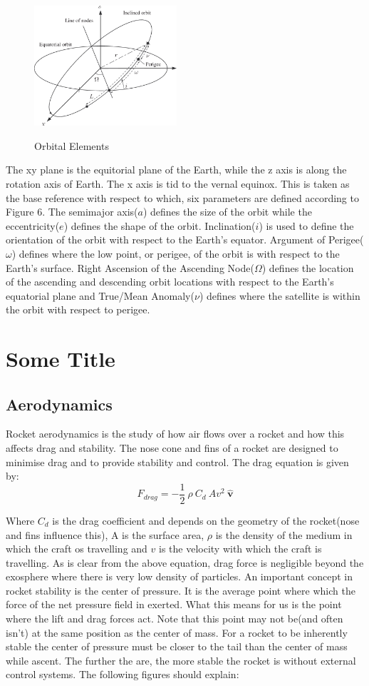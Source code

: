 \documentclass[12pt, letterpaper]{article}
\begin{document}
\begin{figure}[ht]
	\centering
    \includegraphics[width = 200px]{orbital_elements}
    \label{fig:elements}
    \caption{Orbital Elements}
\end{figure}
The xy plane is the equitorial plane of the Earth, while the z axis is along the rotation axis of Earth. The x axis is tid to the vernal equinox. This is taken as the base reference with respect to which, six parameters are defined according to Figure 6. The semimajor axis($a$) defines the size of the orbit while the eccentricity($e$) defines the shape of the orbit. Inclination($i$) is used to define the orientation of the orbit with respect to the Earth's equator. Argument of Perigee($\omega$) defines where the low point, or perigee, of the orbit is with respect to the Earth's surface. Right Ascension of the Ascending Node($\Omega$) defines the location of the ascending and descending orbit locations with respect to the Earth's equatorial plane and True/Mean Anomaly($\nu$) defines where the satellite is within the orbit with respect to perigee.

\newpage
\section{Some Title}
\subsection{Aerodynamics}
Rocket aerodynamics is the study of how air flows over a rocket and how this affects drag and stability. The nose cone and fins of a rocket are designed to minimise drag and to provide stability and control. The drag equation is given by:
\[
	F_{drag} = -\frac{1}{2}\: \rho \: C_d \: A v^2 \: \hat{\mathbf{v}}
\]

Where $C_d$ is the drag coefficient and depends on the geometry of the rocket(nose and fins influence this), A is the surface area, $\rho$ is the density of the medium in which the craft os travelling and $v$ is the velocity with which the craft is travelling. As is clear from the above equation, drag force is negligible beyond the exosphere where there is very low density of particles. An important concept in rocket stability is the center of pressure. It is the average point where which the force of the net pressure field in exerted. What this means for us is the point where the lift and drag forces act. Note that this point may not be(and often isn't) at the same position as the center of mass. For a rocket to be inherently stable the center of pressure must be closer to the tail than the center of mass while ascent. The further the are, the more stable the rocket is without external control systems. The following figures should explain:
\end{document}
